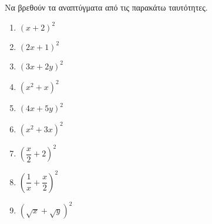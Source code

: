 Να βρεθούν τα αναπτύγματα από τις παρακάτω ταυτότητες.
\begin{multicols}{3}
\begin{enumerate}[label=\roman*.]
\item $ \left(x+2 \right)^2 $
\item $ \left(2x+1 \right)^2 $
\item $ \left(3x+2y \right)^2 $
\item $ \left(x^2+x \right)^2 $
\item $ \left(4x+5y \right)^2 $
\item $ \left(x^2+3x \right)^2 $
\item $ \left(\dfrac{x}{2}+2 \right)^2 $
\item $ \left(\dfrac{1}{x}+\dfrac{x}{2} \right)^2 $
\item $ \left(\sqrt{x}+\sqrt{y} \right)^2 $
\end{enumerate}
\end{multicols}

